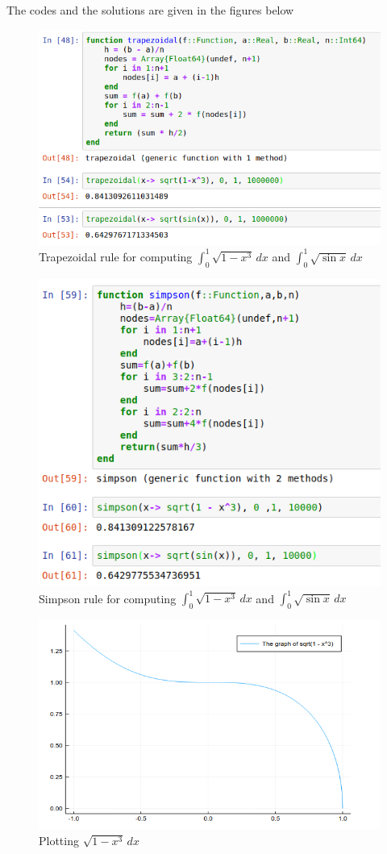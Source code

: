 \documentclass[a4paper,12pt,openany]{book}
\begin{document}
\begin{problem}
	
\end{problem}
\begin{soln}
	The codes and the solutions are given in the figures below
	\begin{figure}[H]
		\centering
		\includegraphics[width=.7\linewidth]{pic12}
		\caption{Trapezoidal rule for computing $\int_{0}^{1} \sqrt{1 - x^3} \, dx$ and $\int_{0}^{1} \sqrt{\sin x} \, dx$}
	\end{figure}

	\begin{figure}[H]
		\centering
		\includegraphics[width=.6\linewidth]{pic13}
		\caption{Simpson rule for computing $\int_{0}^{1} \sqrt{1 - x^3} \, dx$ and $\int_{0}^{1} \sqrt{\sin x} \, dx$}
	\end{figure}

\begin{figure}[H]
	\centering
	\includegraphics[width=.7\linewidth]{pic24}
	\caption{Plotting $ \sqrt{1 - x^3} \, dx$ }
\end{figure}


\end{soln}
\end{document}
